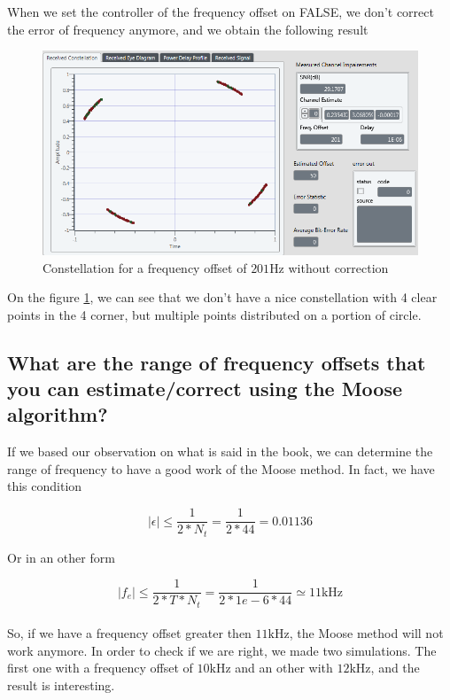 \documentclass[frenchb, oneside, headings=normal]{scrartcl}
\begin{document}
When we set the controller of the frequency offset on FALSE, we don't correct the error of frequency anymore, and we obtain the following result

\begin{figure}[!ht]
\centering
\includegraphics[scale=0.7]{img/test_offset_201hz_OFF.PNG}
\caption{Constellation for a frequency offset of $201 \si{\hertz}$ without correction}
\label{freq_correct_off}
\end{figure}

On the figure \ref{freq_correct_off}, we can see  that we don't have a nice constellation with 4 clear points in the 4 corner, but multiple points distributed on a portion of circle.

\subsection{What are the range of frequency offsets that you can estimate/correct using the Moose algorithm?}

If we based our observation on what is said in the book, we can determine the range of frequency to have a good work of the Moose method. In fact, we have this condition

\begin{equation}
|\epsilon| \leq \frac{1}{2*N_t} = \frac{1}{2*44} = 0.01136
\label{cdt1}
\end{equation}

Or in an other form 

\begin{equation}
|f_e| \leq \frac{1}{2*T*N_t} = \frac{1}{2*1e-6*44} \simeq 11 \si{\kilo\hertz}
\label{cdt2}
\end{equation}\\

So, if we have a frequency offset greater then $11 \si{\kilo\hertz}$, the Moose method will not work anymore. In order to check if we are right, we made two simulations. The first one with a frequency offset of $10 \si{\kilo\hertz}$ and an other with $12 \si{\kilo\hertz}$, and the result is interesting.\\
\end{document}
